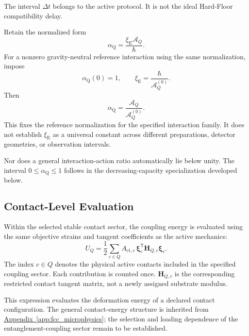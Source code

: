 The interval $\Delta t$ belongs to the active protocol. It is not the ideal Hard-Floor compatibility delay.

Retain the normalized form
\begin{equation}
    \boxed{
    \alpha_{\mathrm Q}
    =\frac{\xi_{\mathrm E}\mathcal A_Q}{\hbar}
    }.
\end{equation}
For a nonzero gravity-neutral reference interaction using the same normalization, impose
\begin{equation}
    \alpha_{\mathrm Q}(0)=1,
    \qquad
    \xi_{\mathrm E}
    =\frac{\hbar}{\mathcal A_Q^{(0)}}.
\end{equation}
Then
\begin{equation}
    \boxed{
    \alpha_{\mathrm Q}
    =\frac{\mathcal A_Q}{\mathcal A_Q^{(0)}}
    }.
\end{equation}
This fixes the reference normalization for the specified interaction family. It does not establish $\xi_{\mathrm E}$ as a universal constant across different preparations, detector geometries, or observation intervals.

Nor does a general interaction-action ratio automatically lie below unity. The interval $0\leq\alpha_{\mathrm Q}\leq1$ follows in the decreasing-capacity specialization developed below.

\subsection{Contact-Level Evaluation}

Within the selected stable contact sector, the coupling energy is evaluated using the same objective strains and tangent coefficients as the active mechanics:
\begin{equation}
    U_Q
    =\frac12\sum_{c\in Q}
    A_{\mathrm{ct},c}\,
    \boldsymbol\xi_c^{\mathsf T}
    \mathbf H_{Q,c}\boldsymbol\xi_c.
\end{equation}
The index $c\in Q$ denotes the physical active contacts included in the specified coupling sector. Each contribution is counted once. $\mathbf H_{Q,c}$ is the corresponding restricted contact tangent matrix, not a newly assigned substrate modulus.

This expression evaluates the deformation energy of a declared contact configuration. The general contact-energy structure is inherited from \hyperref[app:fcc_microphysics]{Appendix~\ref*{app:fcc_microphysics}}; the selection and loading dependence of the entanglement-coupling sector remain to be established.

